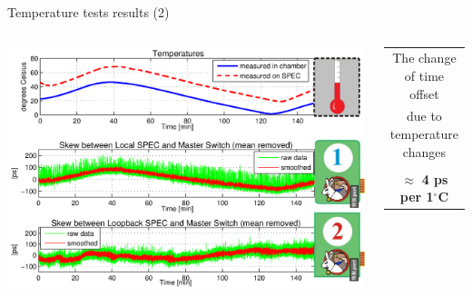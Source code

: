 \documentclass[compress,red]{beamer}
\begin{document}
\begin{frame}{Temperature tests results (2)}


  \begin{columns}[c]
		\hspace{-1.0cm}
		\begin{center}
		\includegraphics[width=1.1\textwidth]{measurements/tempTests-trends_v3.pdf}
		\end{center}

		\begin{center}
		  \begin{table}[!t] \footnotesize 
		  \begin{tabular}{ c  c }    
		  \multicolumn{2}{c}{ The change of time offset }       \\      
		  \multicolumn{2}{c}{ due to temperature changes}       \\    
		  \multicolumn{2}{c}{}       \\  
		  \multicolumn{2}{c}{ $\approx$ \textbf{4 ps per 1}$^{\circ}$\textbf{C}  }       \\  
		  \end{tabular}
		  \end{table}   		
		\end{center}


\end{columns}
\end{frame}
\end{document}
